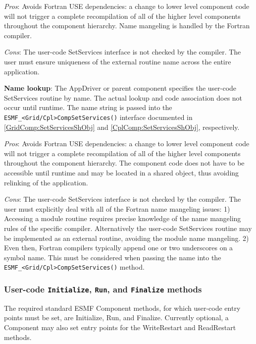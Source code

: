 \begin{itemize}
{\em Pros}: Avoids Fortran USE dependencies: a change to lower level component code will not trigger a complete recompilation of all of the higher level components throughout the component hierarchy. Name mangeling is handled by the Fortran compiler.

{\em Cons}: The user-code SetServices interface is not checked by the compiler. The user must ensure uniqueness of the external routine name across the entire application.

\begin{sloppypar}
\item {\bf Name lookup}: The AppDriver or parent component specifies the user-code SetServices routine by name. The actual lookup and code association does not occur until runtime. The name string is passed into the {\tt ESMF\_<Grid/Cpl>CompSetServices()} interface documented in \ref{GridComp:SetServicesShObj} and \ref{CplComp:SetServicesShObj}, respectively.

{\em Pros}: Avoids Fortran USE dependencies: a change to lower level component code will not trigger a complete recompilation of all of the higher level components throughout the component hierarchy. The component code does not have to be accessible until runtime and may be located in a shared object, thus avoiding relinking of the application.

{\em Cons}: The user-code SetServices interface is not checked by the compiler. The user must explicitly deal with all of the Fortran name mangeling issues: 1) Accessing a module routine requires precise knowledge of the name mangeling rules of the specific compiler. Alternatively the user-code SetServices routine may be implemented as an external routine, avoiding the module name mangeling. 2) Even then, Fortran compilers typically append one or two underscores on a symbol name. This must be considered when passing the name into the {\tt ESMF\_<Grid/Cpl>CompSetServices()} method.

\end{sloppypar}
\end{itemize}

\subsubsection{User-code {\tt Initialize}, {\tt Run}, and {\tt Finalize} methods}

The required standard ESMF Component methods, for which user-code entry
points must be set, are Initialize, Run, and Finalize. Currently optional,
a Component may also set entry points for the WriteRestart and
ReadRestart methods.

